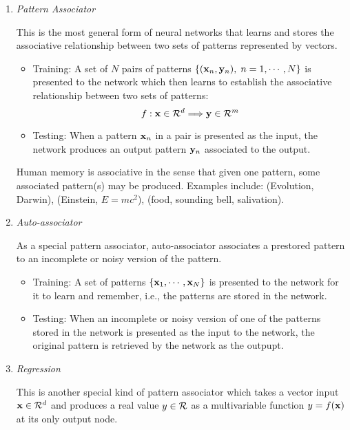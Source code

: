 \documentclass{article}
\begin{document}
\begin{enumerate}

\item {\em Pattern Associator}

  This is the most general form of neural networks that learns and stores 
  the associative relationship between two sets of patterns represented by
  vectors.
  \begin{itemize}
  \item Training: A set of $N$ pairs of patterns $\{ ({\bf x}_n,{\bf y}_n),
    \;n=1,\cdots,N\}$ is presented to the network which then learns to 
    establish the associative relationship between two sets of patterns:
    \begin{equation}
      f: {\bf x} \in {\cal R}^d \Longrightarrow {\bf y} \in {\cal R}^m
    \end{equation}

  \item Testing: When a pattern ${\bf x}_n$ in a pair is presented as the
    input, the network produces an output pattern ${\bf y}_n$ associated to
    the output.
  \end{itemize}

  Human memory is associative in the sense that given one pattern, some 
  associated pattern(s) may be produced. Examples include: (Evolution, Darwin), 
  (Einstein, $E=mc^2$), (food, sounding bell, salivation).

\item {\em Auto-associator}

  As a special pattern associator, auto-associator associates a prestored 
  pattern to an incomplete or noisy version of the pattern.
  \begin{itemize}
  \item Training: A set of patterns $\{{\bf x}_1,\cdots,{\bf x}_N\}$ 
    is presented to the network for it to learn and remember, i.e., the 
    patterns are stored in the network.

  \item Testing: When an incomplete or noisy version of one of the 
    patterns stored in the network is presented as the input to the 
    network, the original pattern is retrieved by the network as the 
    outpupt.  

  \end{itemize}

\item {\em Regression}

  This is another special kind of pattern associator which takes a vector
  input ${\bf x}\in{\cal R}^d$ and produces a real value $y\in{\cal R}$ as
  a multivariable function $y=f({\bf x})$ at its only output node.
  

\end{enumerate}
\end{document}
